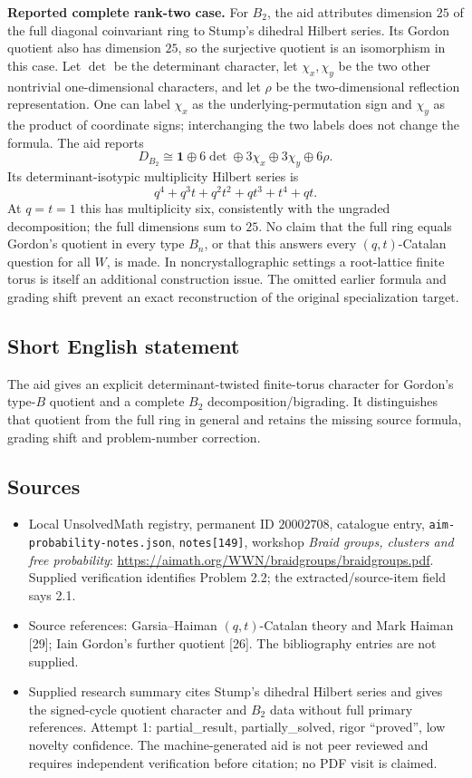 \documentclass[11pt]{article}
\begin{document}
\textbf{Reported complete rank-two case.} For \(B_2\), the aid attributes dimension \(25\) of the full diagonal coinvariant ring to Stump's dihedral Hilbert series. Its Gordon quotient also has dimension \(25\), so the surjective quotient is an isomorphism in this case. Let \(\det\) be the determinant character, let \(\chi_x,\chi_y\) be the two other nontrivial one-dimensional characters, and let \(\rho\) be the two-dimensional reflection representation. One can label \(\chi_x\) as the underlying-permutation sign and \(\chi_y\) as the product of coordinate signs; interchanging the two labels does not change the formula. The aid reports
\[
 D_{B_2}\cong\mathbf1\oplus6\det\oplus3\chi_x\oplus3\chi_y\oplus6\rho.
\]
Its determinant-isotypic multiplicity Hilbert series is
\[
 q^4+q^3t+q^2t^2+qt^3+t^4+qt.
\]
At \(q=t=1\) this has multiplicity six, consistently with the ungraded decomposition; the full dimensions sum to \(25\). No claim that the full ring equals Gordon's quotient in every type \(B_n\), or that this answers every \((q,t)\)-Catalan question for all \(W\), is made. In noncrystallographic settings a root-lattice finite torus is itself an additional construction issue. The omitted earlier formula and grading shift prevent an exact reconstruction of the original specialization target.
\subsection{Short English statement}
The aid gives an explicit determinant-twisted finite-torus character for Gordon's type-\(B\) quotient and a complete \(B_2\) decomposition/bigrading. It distinguishes that quotient from the full ring in general and retains the missing source formula, grading shift and problem-number correction.
\subsection{Sources}
\begin{itemize}
\item Local UnsolvedMath registry, permanent ID \(20002708\), catalogue entry, \texttt{aim-probability-notes.json}, \texttt{notes[149]}, workshop \emph{Braid groups, clusters and free probability}: \url{https://aimath.org/WWN/braidgroups/braidgroups.pdf}. Supplied verification identifies Problem 2.2; the extracted/source-item field says 2.1.
\item Source references: Garsia--Haiman \((q,t)\)-Catalan theory and Mark Haiman [29]; Iain Gordon's further quotient [26]. The bibliography entries are not supplied.
\item Supplied research summary cites Stump's dihedral Hilbert series and gives the signed-cycle quotient character and \(B_2\) data without full primary references. Attempt 1: partial\_result, partially\_solved, rigor ``proved'', low novelty confidence. The machine-generated aid is not peer reviewed and requires independent verification before citation; no PDF visit is claimed.
\end{itemize}
\end{document}
